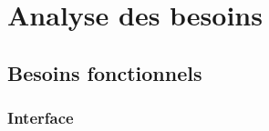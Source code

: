 \documentclass[12pt]{report}
\begin{document}

\newpage

\chapter*{Analyse des besoins}
\setcounter{chapter}{3}






\section{Besoins fonctionnels}
\subsection{Interface}
\end{document}
